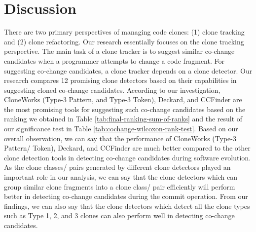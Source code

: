 \documentclass[review]{elsarticle}
\begin{document}
\section{Discussion}
\label{the-discussion}
There are two primary perspectives of managing code clones: (1) clone tracking and (2) clone refactoring. Our research essentially focuses on the clone tracking perspective. The main task of a clone tracker is to suggest similar co-change candidates when a programmer attempts to change a code fragment. For suggesting co-change candidates, a clone tracker depends on a clone detector. Our research compares 12 promising clone detectors based on their capabilities in suggesting cloned co-change candidates. According to our investigation, CloneWorks (Type-3 Pattern, and Type-3 Token), Deckard, and CCFinder are the most promising tools for suggesting such co-change candidates based on the ranking we obtained in Table \ref{tab:final-ranking-sum-of-ranks} and the result of our significance test in Table \ref{tab:cochange-wilcoxon-rank-test}. Based on our overall observation, we can say that the performance of CloneWorks (Type-3 Pattern/ Token), Deckard, and CCFinder are much better compared to the other clone detection tools in detecting co-change candidates during software evolution. As the clone classes/ pairs generated by different clone detectors played an important role in our analysis, we can say that the clone detectors which can group similar clone fragments into a clone class/ pair efficiently will perform better in detecting co-change candidates during the commit operation. From our findings, we can also say that the clone detectors which detect all the clone types such as Type 1, 2, and 3 clones can also perform well in detecting co-change candidates. 

\end{document}
